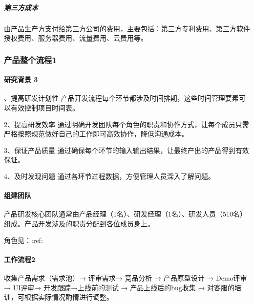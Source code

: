 \documentclass[letterpaper,11pt,english]{sphinxmanual}
\begin{document}
\subparagraph{第三方成本}
\label{\detokenize{chapter_project/AI_hardware:id25}}
由产品生产方支付给第三方公司的费用，主要包括：第三方专利费用、第三方软件授权费用、服务器费用、流量费用、云费用等。


\subsubsection{产品整个流程1\sphinxfootnotemark[270]}
\label{\detokenize{chapter_project/process:id1}}\label{\detokenize{chapter_project/process::doc}}%
\begin{footnotetext}[270]\sphinxAtStartFootnote
{}
%
\end{footnotetext}\ignorespaces 

\paragraph{研究背景 3\sphinxfootnotemark[271]}
\label{\detokenize{chapter_project/process:id2}}%
\begin{footnotetext}[271]\sphinxAtStartFootnote
{}
%
\end{footnotetext}、提高研发计划性
产品开发流程每个环节都涉及时间排期，这些时间管理要素可以有效控制项目时间表。

2、提高研发效率
通过明确开发团队每个角色的职责和协作方式，让每个成员只需严格按照规范做好自己的工作即可高效协作，降低沟通成本。

3、保证产品质量
通过确保每个环节的输入输出结果，让最终产出的产品得到有效保证。

4、及时发现问题 通过各环节过程数据，方便管理人员深入了解问题。


\paragraph{组建团队}
\label{\detokenize{chapter_project/process:id3}}
产品研发核心团队通常由产品经理（1名）、研发经理（1名）、研发人员（5\sphinxhyphen{}10名）组成。产品开发涉及的职责分配到各位成员身上。

角色见：:ref:


\paragraph{工作流程2\sphinxfootnotemark[272]}
\label{\detokenize{chapter_project/process:id4}}%
\begin{footnotetext}[272]\sphinxAtStartFootnote
{}
%
\end{footnotetext}\ignorespaces 
收集产品需求（需求池）→ 评审需求→ 竞品分析 → 产品原型设计 → Demo评审→
UI评审→ 开发跟踪→上线前的测试 → 产品上线后的bug收集 →
对客服的培训，可根据实际情况酌情进行调整。
\end{document}

